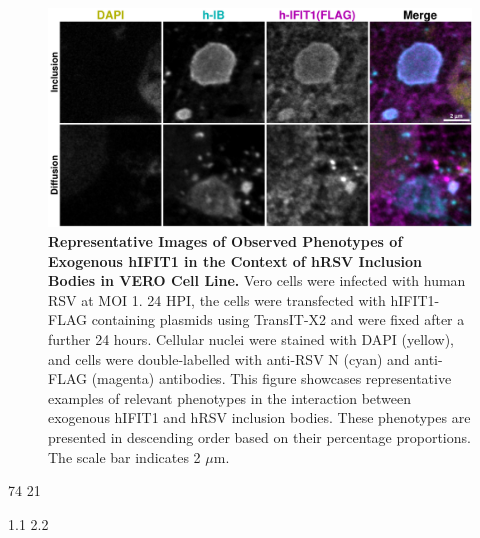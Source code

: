 \begin{figure}
    \centering
    \includegraphics[width=1\linewidth]{09. Chapter 4/Figs/02. Overexpression/01. IFIT1/03. i1-hrsv.pdf}
    \caption[Representative Images of Observed Phenotypes of Exogenous hIFIT1 in the Context of hRSV Inclusion Bodies in VERO Cell Line.]{\textbf{Representative Images of Observed Phenotypes of Exogenous hIFIT1 in the Context of hRSV Inclusion Bodies in VERO Cell Line.} Vero cells were infected with human RSV at MOI 1. 24 HPI, the cells were transfected with hIFIT1-FLAG containing plasmids using TransIT-X2 and were fixed after a further 24 hours. Cellular nuclei were stained with DAPI (yellow), and cells were double-labelled with anti-RSV N (cyan) and anti-FLAG (magenta) antibodies. This figure showcases representative examples of relevant phenotypes in the interaction between exogenous hIFIT1 and hRSV inclusion bodies. These phenotypes are presented in descending order based on their percentage proportions. The scale bar indicates 2 \(\mu \mbox{m}\).}
    \label{fig:Representative Images of Observed Phenotypes of Exogenous hIFIT1 in the Context of hRSV Inclusion Bodies in VERO Cell Line}
\end{figure}

74 21

1.1 2.2

